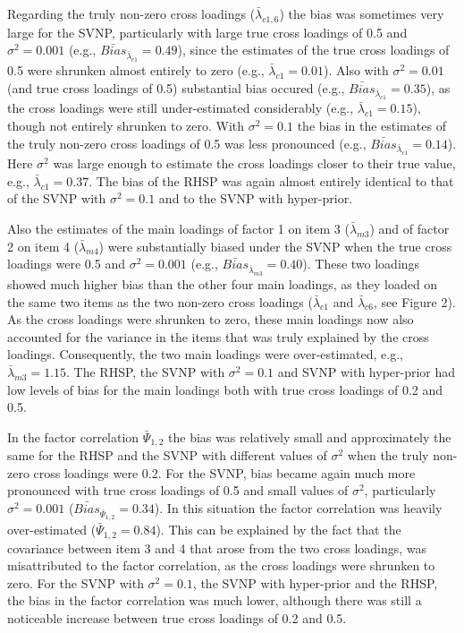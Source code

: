 \documentclass[
  man, donotrepeattitle,floatsintext]{apa6}
\begin{document}
Regarding the truly non-zero cross loadings (\(\bar{\lambda}_{c 1, 6}\))
the bias was sometimes very large for the SVNP, particularly with large
true cross loadings of 0.5 and \(\sigma^2 = 0.001\) (e.g.,
\(\bar{Bias}_{\bar{\lambda}_{c 1}} = 0.49\)), since the estimates of the
true cross loadings of 0.5 were shrunken almost entirely to zero (e.g.,
\(\bar{\lambda}_{c 1} = 0.01\)). Also with \(\sigma^2 = 0.01\) (and true
cross loadings of 0.5) substantial bias occured (e.g.,
\(\bar{Bias}_{\bar{\lambda}_{c 1}} = 0.35\)), as the cross loadings were
still under-estimated considerably (e.g., \(\bar{\lambda}_{c 1} = 0.15\)),
though not entirely shrunken to zero. With \(\sigma^2 = 0.1\) the bias in
the estimates of the truly non-zero cross loadings of 0.5 was less
pronounced (e.g., \(\bar{Bias}_{\bar{\lambda}_{c 1}} = 0.14\)). Here
\(\sigma^2\) was large enough to estimate the cross loadings closer to
their true value, e.g., \(\bar{\lambda}_{c 1} = 0.37\). The bias of the
RHSP was again almost entirely identical to that of the SVNP with
\(\sigma^2 = 0.1\) and to the SVNP with hyper-prior.

Also the estimates of the main loadings of factor 1 on item 3
(\(\bar{\lambda}_{m 3}\)) and of factor 2 on item 4
(\(\bar{\lambda}_{m 4}\)) were substantially biased under the SVNP when
the true cross loadings were 0.5 and \(\sigma^2 = 0.001\) (e.g.,
\(\bar{Bias}_{\bar{\lambda}_{m 3}} = 0.40\)). These two loadings showed
much higher bias than the other four main loadings, as they loaded on
the same two items as the two non-zero cross loadings
(\(\bar{\lambda}_{c 1}\) and \(\bar{\lambda}_{c 6}\), see Figure 2). As the
cross loadings were shrunken to zero, these main loadings now also
accounted for the variance in the items that was truly explained by the
cross loadings. Consequently, the two main loadings were over-estimated,
e.g., \(\bar{\lambda}_{m 3} = 1.15\). The RHSP, the SVNP with
\(\sigma^2 = 0.1\) and SVNP with hyper-prior had low levels of bias for the main loadings both with
true cross loadings of 0.2 and 0.5.

In the factor correlation \(\bar{\Psi}_{1,2}\) the bias was relatively
small and approximately the same for the RHSP and the SVNP with
different values of \(\sigma^2\) when the truly non-zero cross loadings
were 0.2. For the SVNP, bias became again much more pronounced with true
cross loadings of 0.5 and small values of \(\sigma^2\), particularly
\(\sigma^2 = 0.001\) (\(\bar{Bias}_{\bar{\Psi}_{1,2}} = 0.34\)). In this
situation the factor correlation was heavily over-estimated
(\(\bar{\Psi}_{1,2} = 0.84\)). This can be explained by the fact that the
covariance between item 3 and 4 that arose from the two cross loadings,
was misattributed to the factor correlation, as the cross loadings were
shrunken to zero. For the SVNP with \(\sigma^2 = 0.1\), the SVNP with hyper-prior and the RHSP,
the bias in the factor correlation was much lower, although there was
still a noticeable increase between true cross loadings of 0.2 and 0.5.
\end{document}
